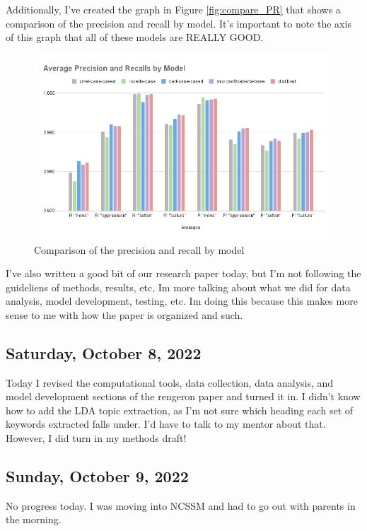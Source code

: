 \documentclass[11pt,letterpaper]{article}
\begin{document}
Additionally, I've created the graph in Figure \ref{fig:compare_PR} that shows a comparison of the precision and recall by model. It's important to note the axis of this graph that all of these models are REALLY GOOD.

\begin{figure}
    \centering
    \includegraphics[scale=0.6]{images/compare_PR.png}
    \caption{Comparison of the precision and recall by model}
    \label{fig:compare_PR.png}
\end{figure}

I've also written a good bit of our research paper today, but I'm not following the guideliens of methods, results, etc, Im more talking about what we did for data analysis, model development, testing, etc. Im doing this because this makes more sense to me with how the paper is organized and such.

\subsection{Saturday, October 8, 2022}
Today I revised the computational tools, data collection, data analysis, and model development sections of the rengeron paper and turned it in. I didn't know how to add the LDA topic extraction, as I'm not sure which heading each set of keywords extracted falls under. I'd have to talk to my mentor about that. However, I did turn in my methods draft!

\subsection{Sunday, October 9, 2022}
No progress today. I was moving into NCSSM and had to go out with parents in the morning.
\end{document}
